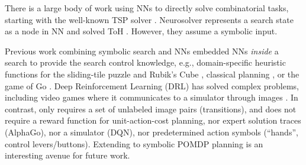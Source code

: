 \documentclass[11pt]{article}
\begin{document}
There is a large body of work using NNs to directly solve combinatorial tasks,
starting with the well-known TSP solver \cite{hopfield1985neural}.
Neurosolver represents a search state as a node in NN 
and solved ToH \cite{bieszczad2015neurosolver}. %
However, they assume a symbolic input.
\begin{comment}
Previous work combining NNs and symbolic search algorithms embedded NNs {\it inside} a search algorithm
to provide search control knowledge \cite{alphago,ArfaeeZH11} %
In contrast, we use a NN-based SAE for symbol grounding, not for search control.
\end{comment}

Previous work combining symbolic search and NNs embedded NNs {\it inside} a search
to provide the search control knowledge,
e.g., domain-specific heuristic functions for
the sliding-tile puzzle and Rubik's Cube \cite{ArfaeeZH11},
classical planning \cite{SatzgerK13},
or the game of Go \cite{alphago}.
Deep Reinforcement Learning (DRL) has solved complex problems,
including video games where it communicates to a simulator through images \cite[DQN]{dqn}.
%
In contrast, \latentplanner only requires a set of unlabeled image pairs (transitions), and 
does not require a reward function for unit-action-cost planning,
nor expert solution traces (AlphaGo),
nor a  simulator (DQN), nor predetermined action symbols (``hands'', control levers/buttons).
Extending \latentplanner to symbolic POMDP planning is an interesting avenue for future work.
\end{document}
